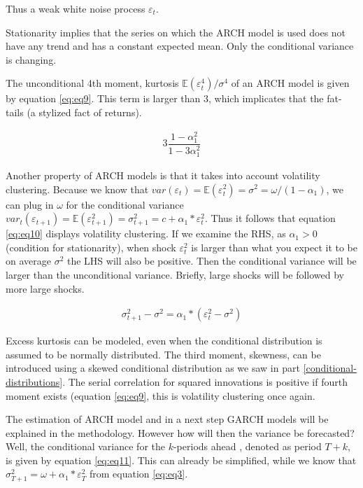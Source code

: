 \documentclass[a4paper, twoside]{templates/ociamthesis}
\begin{document}
\noindent Thus a weak white noise process \(\varepsilon_t\).

\noindent Stationarity implies that the series on which the ARCH model is used does not have any trend and has a constant expected mean. Only the conditional variance is changing.

\noindent The unconditional 4th moment, kurtosis \(\mathbb{E}(\varepsilon_t^4)/\sigma^4\) of an ARCH model is given by equation \eqref{eq:eq9}. This term is larger than 3, which implicates that the fat-tails (a stylized fact of returns).

\begin{align} 
3\dfrac{1-\alpha_1^2}{1-3\alpha_1^2}
 \label{eq:eq9}
\end{align}

\noindent Another property of ARCH models is that it takes into account volatility clustering. Because we know that \(var(\varepsilon_t) = \mathbb{E}(\varepsilon_t^2) = \sigma^2 = \omega/(1-\alpha_1)\), we can plug in \(\omega\) for the conditional variance \(var_t(\varepsilon_{t+1}) = \mathbb{E}(\varepsilon_{t+1}^2) = \sigma_{t+1}^2 = c + \alpha_1*\varepsilon_t^2\). Thus it follows that equation \eqref{eq:eq10} displays volatility clustering. If we examine the RHS, as \(\alpha_1>0\) (condition for stationarity), when shock \(\varepsilon_t^2\) is larger than what you expect it to be on average \(\sigma^2\) the LHS will also be positive. Then the conditional variance will be larger than the unconditional variance. Briefly, large shocks will be followed by more large shocks.

\begin{align} 
\sigma_{t+1}^2 - \sigma^2 = \alpha_1*(\varepsilon_t^2 - \sigma^2)
 \label{eq:eq10}
\end{align}

\noindent Excess kurtosis can be modeled, even when the conditional distribution is assumed to be normally distributed. The third moment, skewness, can be introduced using a skewed conditional distribution as we saw in part \ref{conditional-distributions}. The serial correlation for squared innovations is positive if fourth moment exists (equation \eqref{eq:eq9}, this is volatility clustering once again.

\noindent The estimation of ARCH model and in a next step GARCH models will be explained in the methodology. However how will then the variance be forecasted? Well, the conditional variance for the \(k\)-periods ahead , denoted as period \(T+k\), is given by equation \eqref{eq:eq11}. This can already be simplified, while we know that \(\sigma_{T+1}^2 = \omega + \alpha_1 * \varepsilon_T^2\) from equation \eqref{eq:eq3}.
\end{document}
